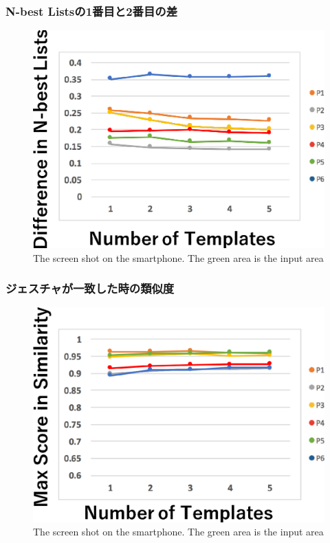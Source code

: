 \subsubsection{N-best Listsの1番目と2番目の差}
\begin{figure}[!h]
\centering
\includegraphics[width=0.7\columnwidth]{img/rec_diff.eps}
\caption{The screen shot on the smartphone. The green area is the input area}
\label{fig:rec_diff}
\end{figure}

\subsubsection{ジェスチャが一致した時の類似度}
\begin{figure}[!h]
\centering
\includegraphics[width=0.7\columnwidth]{img/rec_sim.eps}
\caption{The screen shot on the smartphone. The green area is the input area}
\label{fig:rare_rec}
\end{figure}

